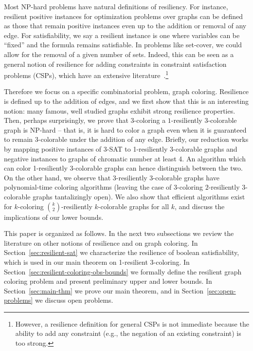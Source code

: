 \documentclass{llncs}
\begin{document}
Most NP-hard problems have natural definitions of resiliency.  For instance,
resilient positive instances for optimization problems over graphs can be
defined as those that remain positive instances even up to the addition or
removal of any edge.  For satisfiability, we say a resilient instance is one
where variables can be ``fixed'' and the formula remains satisfiable. In
problems like set-cover, we could allow for the removal of a given number of
sets. Indeed, this can be seen as a general notion of resilience for adding
constraints in constraint satisfaction problems (CSPs), which have an extensive
literature~\cite{Kumar92}.\footnote{However, a resilience definition for
general CSPs is not immediate because the ability to add any constraint (e.g.,
the negation of an existing constraint) is too strong.}

Therefore we focus on a specific combinatorial problem, graph coloring.
Resilience is defined up to the addition of edges, and we first show that this
is an interesting notion: many famous, well studied graphs exhibit strong
resilience properties. Then, perhaps surprisingly, we prove that $3$-coloring a
$1$-resiliently 3-colorable graph is NP-hard -- that is, it is hard to color a
graph even when it is guaranteed to remain $3$-colorable under the addition of
any edge. Briefly, our reduction works by mapping positive instances of 3-SAT
to 1-resiliently 3-colorable graphs and negative instances to graphs of
chromatic number at least 4. An algorithm which can color 1-resiliently
3-colorable graphs can hence distinguish between the two. On the other hand, we
observe that $3$-resiliently $3$-colorable graphs have polynomial-time coloring
algorithms (leaving the case of 3-coloring $2$-resiliently $3$-colorable graphs
tantalizingly open). We also show that efficient algorithms exist for
$k$-coloring $\binom{k}{2}$-resiliently $k$-colorable graphs for all $k$, and
discuss the implications of our lower bounds. 

This paper is organized as follows. In the next two subsections we review the
literature on other notions of resilience and on graph coloring. In
Section~\ref{sec:resilient-sat} we characterize the resilience of boolean
satisfiability, which is used in our main theorem on 1-resilient 3-coloring. In
Section~\ref{sec:resilient-coloring-obs-bounds} we formally define the
resilient graph coloring problem and present preliminary upper and lower
bounds. In Section~\ref{sec:main-thm} we prove our main theorem, and in
Section~\ref{sec:open-problems} we discuss open problems.
\end{document}
